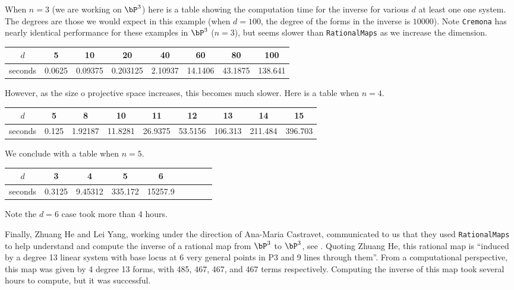 \documentclass[11pt]{amsart}
\numberwithin{equation}{theorem}
\renewcommand{\:}{\colon}
\theoremstyle{theorem}
\begin{document}
{\color{black}\normalsize
When $n = 3$ (we are working on $\bP^3$) here is a table showing the computation time for the inverse for various $d$ at least one one system.  The degrees are those we would expect in this example (when $d = 100$, the degree of the forms in the inverse is $10000$).  Note {\tt Cremona} has nearly identical performance for these examples in $\bP^3$ ($n = 3$), but seems slower than {\tt RationalMaps} as we increase the dimension.
\begin{center}
\begin{tabular}{c|c|c|c|c|c|c|c}
  $d$ & 5 & 10 & 20 & 40 & 60 & 80 & 100 \\ \hline
  seconds  &  0.0625 &  0.09375 & 0.203125 &  2.10937 & 14.1406 &  43.1875 & 138.641 \\
\end{tabular}
\end{center}
However, as the size o projective space increases, this becomes much slower.  Here is a table when $n = 4$.
\begin{center}
  \begin{tabular}{c|c|c|c|c|c|c|c|c}
    $d$ & 5 & 8 & 10 & 11 & 12 & 13 & 14 & 15 \\ \hline
    seconds  &  0.125 & 1.92187 &  11.8281 &  26.9375 &   53.5156 & 106.313 &   211.484 &  396.703 \\
  \end{tabular}
\end{center}

We conclude with a table when $n = 5$.
\begin{center}
  \begin{tabular}{c|c|c|c|c|c|c|c|c}
    $d$ & 3 & 4 & 5 & 6  \\ \hline
    seconds  &  0.3125 & 9.45312 &  335.172 &  15257.9  \\
  \end{tabular}
\end{center}
Note the $d = 6$ case took more than 4 hours.


Finally, Zhuang He and Lei Yang, working under the direction of Ana-Maria Castravet, communicated to us that they used {\tt RationalMaps} to help understand and compute the inverse of a rational map from $\bP^3$ to $\bP^3$, see \cite{HeYangTheMoriDreamSpacePropertyOfBlowups}.  Quoting Zhuang He, this rational map is ``induced by a degree 13 linear system with base locus at 6 very general points in P3 and 9 lines through them''.  From a computational perspective, this map was given by 4 degree 13 forms, with 485, 467, 467, and 467 terms respectively.  Computing the inverse of this map took several hours to compute, but it was successful.   %




}
\color{black}
\end{document}
